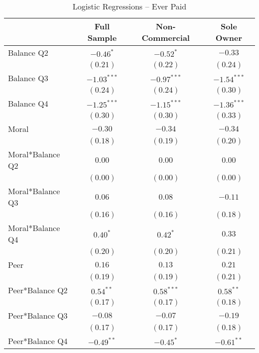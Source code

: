 \documentclass[12pt,titlepage]{article}
\begin{document}
\begin{table}[htbp]
\caption{Logistic Regressions -- Ever Paid} \label{YY}
{\footnotesize
\begin{center}
\begin{tabular}{l c c c }
\hline
                  & Full Sample & Non-Commercial & Sole Owner \\
\hline
Balance Q2        & $-0.46^{*}$   & $-0.52^{*}$   & $-0.33$       \\
                  & $(0.21)$      & $(0.22)$      & $(0.24)$      \\
Balance Q3        & $-1.03^{***}$ & $-0.97^{***}$ & $-1.54^{***}$ \\
                  & $(0.24)$      & $(0.24)$      & $(0.30)$      \\
Balance Q4        & $-1.25^{***}$ & $-1.15^{***}$ & $-1.36^{***}$ \\
                  & $(0.30)$      & $(0.30)$      & $(0.33)$      \\
Moral             & $-0.30$       & $-0.34$       & $-0.34$       \\
                  & $(0.18)$      & $(0.19)$      & $(0.20)$      \\
Moral*Balance Q2  & $0.00$        & $0.00$        & $0.00$        \\
                  & $(0.00)$      & $(0.00)$      & $(0.00)$      \\
Moral*Balance Q3  & $0.06$        & $0.08$        & $-0.11$       \\
                  & $(0.16)$      & $(0.16)$      & $(0.18)$      \\
Moral*Balance Q4  & $0.40^{*}$    & $0.42^{*}$    & $0.33$        \\
                  & $(0.20)$      & $(0.20)$      & $(0.21)$      \\
Peer              & $0.16$        & $0.13$        & $0.21$        \\
                  & $(0.19)$      & $(0.19)$      & $(0.21)$      \\
Peer*Balance Q2   & $0.54^{**}$   & $0.58^{***}$  & $0.58^{**}$   \\
                  & $(0.17)$      & $(0.17)$      & $(0.18)$      \\
Peer*Balance Q3   & $-0.08$       & $-0.07$       & $-0.19$       \\
                  & $(0.17)$      & $(0.17)$      & $(0.18)$      \\
Peer*Balance Q4   & $-0.49^{**}$  & $-0.45^{*}$   & $-0.61^{**}$  \\

\end{tabular}
\end{center}}
\end{table}
\end{document}
